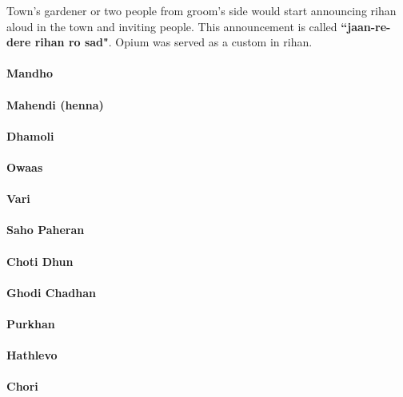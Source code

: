 Town's gardener or two people from groom's side would start announcing rihan
aloud in the town and inviting people. This announcement is called
\textbf{``jaan-re-dere rihan ro sad"}. Opium was served as a custom in rihan.

\paragraph{Mandho}

\paragraph{Mahendi (henna)}

\paragraph{Dhamoli}

\paragraph{Owaas}

\paragraph{Vari}

\paragraph{Saho Paheran}

\paragraph{Choti Dhun}

\paragraph{Ghodi Chadhan}

\paragraph{Purkhan}

\paragraph{Hathlevo}

\paragraph{Chori}

